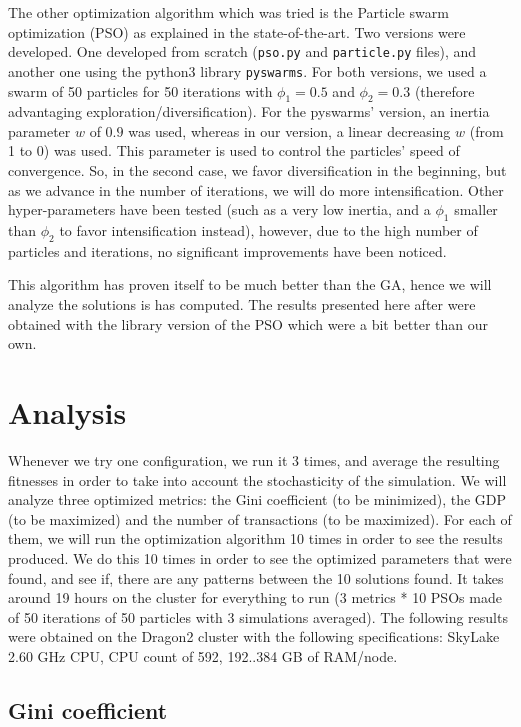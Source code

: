     The other optimization algorithm which was tried is the Particle swarm optimization (PSO) as explained in the state-of-the-art. Two versions were developed. One developed from scratch (\texttt{pso.py} and \texttt{particle.py} files), and another one using the python3 library \texttt{pyswarms}. For both versions, we used a swarm of 50 particles for 50 iterations with $\phi_1 = 0.5$ and $\phi_2 = 0.3$ (therefore advantaging exploration/diversification). For the pyswarms' version, an inertia parameter $w$ of $0.9$ was used, whereas in our version, a linear decreasing $w$ (from 1 to 0) was used. This parameter is used to control the particles' speed of convergence. So, in the second case, we favor diversification in the beginning, but as we advance in the number of iterations, we will do more intensification. \cite{psoDorigo} Other hyper-parameters have been tested (such as a very low inertia, and a $\phi_1$ smaller than $\phi_2$ to favor intensification instead), however, due to the high number of particles and iterations, no significant improvements have been noticed.
    
    This algorithm has proven itself to be much better than the GA, hence we will analyze the solutions is has computed. The results presented here after were obtained with the library version of the PSO which were a bit better than our own.

\section{Analysis}
    Whenever we try one configuration, we run it 3 times, and average the resulting fitnesses in order to take into account the stochasticity of the simulation. We will analyze three optimized metrics: the Gini coefficient (to be minimized), the GDP (to be maximized) and the number of transactions (to be maximized). For each of them, we will run the optimization algorithm 10 times in order to see the results produced. We do this 10 times in order to see the optimized parameters that were found, and see if, there are any patterns between the 10 solutions found. It takes around 19 hours on the cluster for everything to run (3 metrics * 10 PSOs made of 50 iterations of 50 particles with 3 simulations averaged). The following results were obtained on the Dragon2 cluster with the following specifications: SkyLake 2.60 GHz CPU, CPU count of 592, 192..384 GB of RAM/node.

    \subsection{Gini coefficient}

